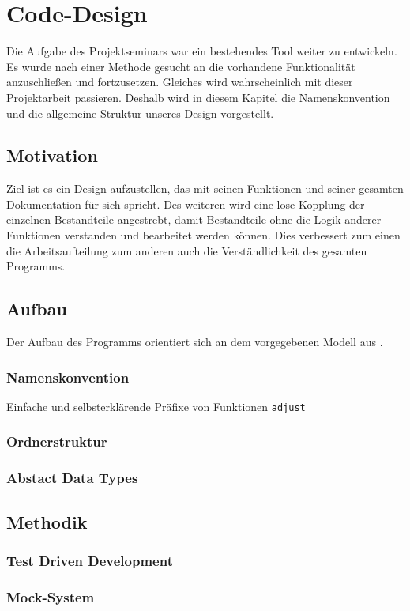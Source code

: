 \documentclass[../Report.tex]{subfiles}
\begin{document}
\chapter{Code-Design}
\label{chap:code}
Die Aufgabe des Projektseminars war ein bestehendes Tool weiter zu entwickeln. Es wurde nach einer Methode gesucht an die vorhandene Funktionalität anzuschließen und fortzusetzen. Gleiches wird wahrscheinlich mit dieser Projektarbeit passieren. Deshalb wird in diesem Kapitel die Namenskonvention und die allgemeine Struktur unseres Design vorgestellt.

\section{Motivation}
\label{sec:code.motivation}
Ziel ist es ein Design aufzustellen, das mit seinen Funktionen und seiner gesamten Dokumentation für sich spricht. Des weiteren wird eine lose Kopplung der einzelnen Bestandteile angestrebt, damit Bestandteile ohne die Logik anderer Funktionen verstanden und bearbeitet werden können. Dies verbessert zum einen die Arbeitsaufteilung zum anderen auch die Verständlichkeit des gesamten Programms.

\section{Aufbau}
\label{sec:code.aufbau}
Der Aufbau des Programms orientiert sich an dem vorgegebenen Modell aus .

\subsection{Namenskonvention}
\label{subsec:code.namen}
Einfache und selbsterklärende Präfixe von Funktionen \lstinline{adjust_}


 

\subsection{Ordnerstruktur}
\label{subsec:code.ordner}

\subsection{Abstact Data Types}
\label{subsec:code.adt}

\section{Methodik}
\label{subsec:code.methodik}

\subsection{Test Driven Development}
\label{subsec:code.tdd}

\subsection{Mock-System}
\label{subsec:code.mock}
\end{document}
